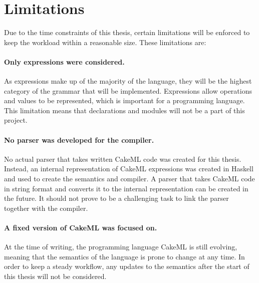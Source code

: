 \section{Limitations}
\label{sec:limitations}
Due to the time constraints of this thesis, certain limitations will be enforced
to keep the workload within a reasonable size. These limitations are:

\paragraph{Only expressions were considered.}
As expressions make up of the majority of the language, they will be the highest
category of the grammar that will be implemented. Expressions allow operations
and values to be represented, which is important for a programming language.
This limitation means that declarations and modules will not be a part of this
project.

\paragraph{No parser was developed for the compiler.}
No actual parser that takes written CakeML code was created for this thesis.
Instead, an internal representation of CakeML expressions was created in
Haskell and used to create the semantics and compiler. A parser that
takes CakeML code in string format and converts it to the internal
representation can be created in the future. It should not prove to
be a challenging task to link the parser together with the compiler.

\paragraph{A fixed version of CakeML was focused on.}
At the time of writing, the programming language CakeML is still evolving,
meaning that the semantics of the language is prone to change at
any time. In order to keep a steady workflow, any updates to the semantics after
the start of this thesis will not be considered.
